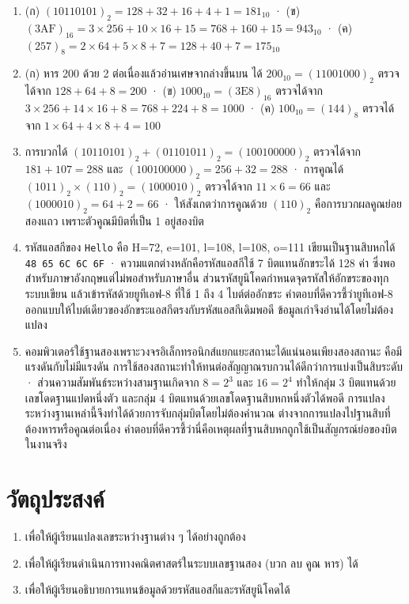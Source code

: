 \begin{enumerate}
    \item (ก) $(10110101)_2 = 128+32+16+4+1 = 181_{10}$ · (ข) $(3\mathrm{AF})_{16} = 3\times256 + 10\times16 + 15 = 768+160+15 = 943_{10}$ · (ค) $(257)_8 = 2\times64 + 5\times8 + 7 = 128+40+7 = 175_{10}$

    \item (ก) หาร 200 ด้วย 2 ต่อเนื่องแล้วอ่านเศษจากล่างขึ้นบน ได้ $200_{10} = (11001000)_2$ ตรวจได้จาก $128+64+8 = 200$ · (ข) $1000_{10} = (3\mathrm{E}8)_{16}$ ตรวจได้จาก $3\times256 + 14\times16 + 8 = 768+224+8 = 1000$ · (ค) $100_{10} = (144)_8$ ตรวจได้จาก $1\times64 + 4\times8 + 4 = 100$

    \item การบวกได้ $(10110101)_2 + (01101011)_2 = (100100000)_2$ ตรวจได้จาก $181 + 107 = 288$ และ $(100100000)_2 = 256+32 = 288$ · การคูณได้ $(1011)_2 \times (110)_2 = (1000010)_2$ ตรวจได้จาก $11 \times 6 = 66$ และ $(1000010)_2 = 64+2 = 66$ · ให้สังเกตว่าการคูณด้วย $(110)_2$ คือการบวกผลคูณย่อยสองแถว เพราะตัวคูณมีบิตที่เป็น 1 อยู่สองบิต

    \item รหัสแอสกีของ \texttt{Hello} คือ H=72, e=101, l=108, l=108, o=111 เขียนเป็นฐานสิบหกได้ \texttt{48 65 6C 6C 6F} · ความแตกต่างหลักคือรหัสแอสกีใช้ 7 บิตแทนอักขระได้ 128 ค่า ซึ่งพอสำหรับภาษาอังกฤษแต่ไม่พอสำหรับภาษาอื่น ส่วนรหัสยูนิโคดกำหนดจุดรหัสให้อักขระของทุกระบบเขียน แล้วเข้ารหัสด้วยยูทีเอฟ-8 ที่ใช้ 1 ถึง 4 ไบต์ต่ออักขระ คำตอบที่ดีควรชี้ว่ายูทีเอฟ-8 ออกแบบให้ไบต์เดียวของอักขระแอสกีตรงกับรหัสแอสกีเดิมพอดี ข้อมูลเก่าจึงอ่านได้โดยไม่ต้องแปลง

    \item คอมพิวเตอร์ใช้ฐานสองเพราะวงจรอิเล็กทรอนิกส์แยกแยะสถานะได้แน่นอนเพียงสองสถานะ คือมีแรงดันกับไม่มีแรงดัน การใช้สองสถานะทำให้ทนต่อสัญญาณรบกวนได้ดีกว่าการแบ่งเป็นสิบระดับ · ส่วนความสัมพันธ์ระหว่างสามฐานเกิดจาก $8 = 2^3$ และ $16 = 2^4$ ทำให้กลุ่ม 3 บิตแทนด้วยเลขโดดฐานแปดหนึ่งตัว และกลุ่ม 4 บิตแทนด้วยเลขโดดฐานสิบหกหนึ่งตัวได้พอดี การแปลงระหว่างฐานเหล่านี้จึงทำได้ด้วยการจับกลุ่มบิตโดยไม่ต้องคำนวณ ต่างจากการแปลงไปฐานสิบที่ต้องหารหรือคูณต่อเนื่อง คำตอบที่ดีควรชี้ว่านี่คือเหตุผลที่ฐานสิบหกถูกใช้เป็นสัญกรณ์ย่อของบิตในงานจริง
\end{enumerate}

\newpage
{}
\section*{วัตถุประสงค์}
\begin{enumerate}
    \item เพื่อให้ผู้เรียนแปลงเลขระหว่างฐานต่าง ๆ ได้อย่างถูกต้อง
    \item เพื่อให้ผู้เรียนดำเนินการทางคณิตศาสตร์ในระบบเลขฐานสอง (บวก ลบ คูณ หาร) ได้
    \item เพื่อให้ผู้เรียนอธิบายการแทนข้อมูลด้วยรหัสแอสกีและรหัสยูนิโคดได้
\end{enumerate}
